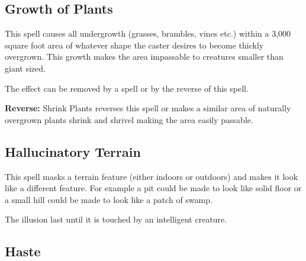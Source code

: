 \begin{multicols*}{2}
\subsection{Growth of Plants}\label{spell:Growth of Plants}

This spell causes all undergrowth (grasses, brambles, vines etc.) within a 3,000 square foot area of whatever shape the caster desires to become thickly overgrown. This growth makes the area impassable to creatures smaller than giant sized.

The effect can be removed by a  spell or by the reverse of this spell.

\textbf{Reverse:} \hypertarget{spell:Shrink Plants}{Shrink Plants} reverses this spell or makes a similar area of naturally overgrown plants shrink and shrivel making the area easily passable.

\subsection{Hallucinatory Terrain}\label{spell:Hallucinatory Terrain}

This spell masks a terrain feature (either indoors or outdoors) and makes it look like a different feature. For example a pit could be made to look like solid floor or a small hill could be made to look like a patch of swamp.

The illusion last until it is touched by an intelligent creature.

\subsection{Haste}\label{spell:Haste}
\end{multicols*}
